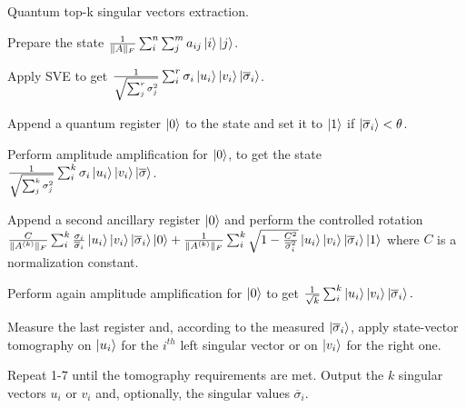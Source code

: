 \documentclass{article}
\begin{document}
\pagestyle{empty}


\begin{algorithm}[ht]
	\caption{Quantum top-k singular vectors extraction.}
	\begin{algorithmic}[1]
		\State Prepare the state $\frac{1}{\|A\|_F}\sum_{i}^{n}\sum_{j}^{m}a_{ij}\ket{i}\ket{j}$. 
		
	    \State Apply SVE 
	    to get $\frac{1}{\sqrt{\sum_{j}^{r}\sigma_j^2}}\sum_{i}^{r} \sigma_i \ket{u_i}\ket{v_i}\ket{\overline{\sigma}_i}$. 

		\State Append a quantum register $\ket{0}$ to the state and set it to $\ket{1}$ if $\ket{\overline{\sigma}_i} < \theta$.

		\State Perform amplitude amplification for $\ket{0}$, to get the state
       $\frac{1}{\sqrt{\sum_j^k \sigma_j^2}}\sum_i^k \sigma_i\ket{u_i}\ket{v_i}\ket{\overline{\sigma}}$.

        \State Append a second ancillary register $\ket{0}$ and perform the controlled rotation
        $\frac{C}{\|A^{(k)}\|_F}\sum_i^k \frac{\sigma_i}{\overline{\sigma}_i} \ket{u_i}\ket{v_i}\ket{\overline{\sigma}_i}\ket{0} +\frac{1}{\|A^{(k)}\|_F}\sum_i^k \sqrt{1-\frac{C^2}{\overline{\sigma}_i^2}}\ket{u_i}\ket{v_i}\ket{\overline{\sigma}_i}\ket{1}$ 
        where $C$ is a normalization constant.
        
		\State Perform again amplitude amplification for $\ket{0}$ to get
        $\frac{1}{\sqrt{k}}\sum_i^k \ket{u_i}\ket{v_i}\ket{\overline{\sigma}_i}.$ 

		\State Measure the last register and, according to the measured $\ket{\overline{\sigma}_i}$, apply state-vector tomography on $\ket{u_i}$ for the $i^{th}$ left singular vector or on $\ket{v_i}$ for the right one.
		
		\State Repeat 1-7 until the tomography requirements are met.
		\State Output the $k$ singular vectors $u_i$ or $v_i$ and, optionally, the singular values $\overline{\sigma}_i$.
    \end{algorithmic}
\end{algorithm} 
\end{document}
